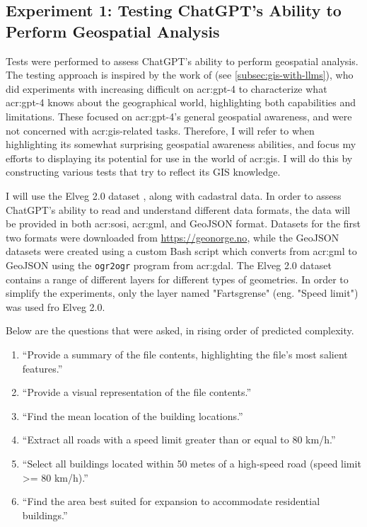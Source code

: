 \subsection{Experiment 1: Testing ChatGPT's Ability to Perform Geospatial Analysis}

Tests were performed to assess ChatGPT's ability to perform geospatial analysis. The testing approach is inspired by the work of \cite{robertsGPT4GEOHowLanguage2023} (see \autoref{subsec:gis-with-llms}), who did experiments with increasing difficult on \acrshort{acr:gpt}-4 to characterize what \acrshort{acr:gpt}-4 knows about the geographical world, highlighting both capabilities and limitations. These focused on \acrshort{acr:gpt}-4's general geospatial awareness, and were not concerned with \acrshort{acr:gis}-related tasks. Therefore, I will refer to \cite{robertsGPT4GEOHowLanguage2023} when highlighting its somewhat surprising geospatial awareness abilities, and focus my efforts to displaying its potential for use in the world of \acrshort{acr:gis}. I will do this by constructing various tests that try to reflect its GIS knowledge.

I will use the Elveg 2.0 dataset \citep{thenorwegianmappingauthorityElveg2019}, along with cadastral data. In order to assess ChatGPT's ability to read and understand different data formats, the data will be provided in both \acrshort{acr:sosi}, \acrshort{acr:gml}, and GeoJSON format. Datasets for the first two formats were downloaded from \url{https://geonorge.no}, while the GeoJSON datasets were created using a custom Bash script which converts from \acrshort{acr:gml} to GeoJSON using the \texttt{ogr2ogr} program from \acrshort{acr:gdal}. The Elveg 2.0 dataset contains a range of different layers for different types of geometries. In order to simplify the experiments, only the layer named "Fartsgrense" (eng. "Speed limit") was used fro Elveg 2.0.

Below are the questions that were asked, in rising order of predicted complexity.

\begin{enumerate}
    \item \enquote{Provide a summary of the file contents, highlighting the file's most salient features.}
    \item \enquote{Provide a visual representation of the file contents.}
    \item \enquote{Find the mean location of the building locations.}
    \item \enquote{Extract all roads with a speed limit greater than or equal to 80 km/h.}
    \item \enquote{Select all buildings located within 50 metes of a high-speed road (speed limit >= 80 km/h).}
    \item \enquote{Find the area best suited for expansion to accommodate residential buildings.}
\end{enumerate}
\label{enum:gpt-gis-questions}

